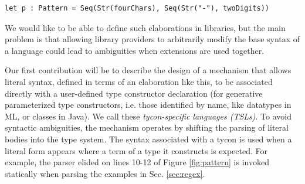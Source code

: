 \begin{lstlisting}[numbers=none]
let p : Pattern = Seq(Str(fourChars), Seq(Str("-"), twoDigits))
\end{lstlisting}

We would like to be able to define such elaborations in libraries, but the main problem is that allowing library providers to arbitrarily modify the base syntax of a language could lead to ambiguities when extensions are used together.

\begin{contribution}\label{cont:TSLs}
Our first contribution will be to describe the design of a mechanism that allows literal syntax, defined  in terms of an  elaboration like this, to  be associated directly with a user-defined type constructor declaration (for generative parameterized type constructors, i.e. those identified by name, like datatypes in ML, or classes in Java). We call these \emph{tycon-specific languages (TSLs)}. 
To avoid syntactic ambiguities, the mechanism operates by shifting the parsing of literal  bodies into the type system. The syntax associated with a tycon is used when a literal form appears where a term of a type it constructs is expected. For example, the parser elided on lines 10-12 of Figure \ref{fig:pattern} is invoked statically when parsing the examples in Sec. \ref{sec:regex}.
\end{contribution}


